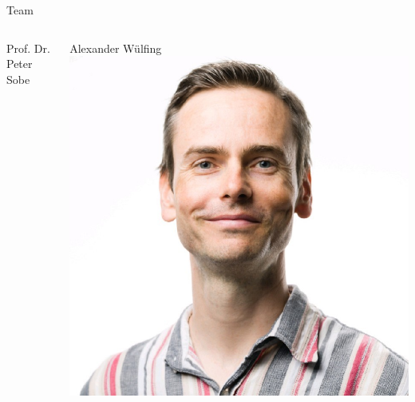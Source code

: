 \documentclass[xelatex,aspectratio=168]{beamer}
\begin{document}
\begin{frame}{Team}
\begin{columns}
\begin{column}{.35\textwidth}
\begin{block}{Prof. Dr. Peter Sobe}
      \end{block}
    \end{column}
    \begin{column}{.30\textwidth}
      \begin{block}{Alexander Wülfing}
        \centering\includegraphics[height=.55\textheight]{img/wuelfing.jpg}
      \end{block}
    \end{column}
  \end{columns}
\end{frame}
\end{document}
